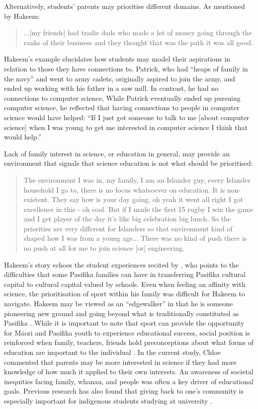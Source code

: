 Alternatively, students' parents may prioritise different domains. As mentioned by Hakeem: \blockquote{...[my friends] had tradie dads who made a lot of money going through the ranks of their business and they thought that was the path it was all good.} Hakeem's example elucidates how students may model their aspirations in relation to those they have connections to. Patrick, who had ``heaps of family in the navy'' and went to army cadets, originally aspired to join the army, and ended up working with his father in a saw mill. In contrast, he had no connections to computer science, While Patrick eventually ended up pursuing computer science, he reflected that having connections to people in computer science would have helped:  ``If I just got someone to talk to me [about computer science] when I was young to get me interested in computer science I think that would help.'' 

Lack of family interest in science, or education in general, may provide an environment that signals that science education is not what should be prioritised: \blockquote{The environment I was in, my family, I am an Islander guy, every Islander household I go to, there is no focus whatsoever on education. It is non-existent. They say how is your day going, oh yeah it went all right I got excellence in this - oh cool. But if I made the first 15 rugby I win the game and I get player of the day it's like big celebration big lunch. So the priorities are very different for Islanders so that environment kind of shaped how I was from a young age... There was no kind of push there is no push at all for me to join science [or] engineering.}. Hakeem's story echoes the student experiences recited by \cite{mila2011polycultural}, who points to the difficulties that some Pasifika families can have in transferring Pasifika cultural capital to cultural capital valued by schools. Even when feeling an affinity with science, the prioritisation of sport within his family was difficult for Hakeem to navigate. Hakeem may be viewed as an ``edgewalker'' \citep{krebs1999edgewalkers,tupuola2004pasifika} in that he is someone pioneering new ground and going beyond what is traditionally constituted as Pasifika \cite[p.8]{mila2011polycultural}.  While it is important to note that sport can provide the opportunity for M\={a}ori and Pasifika youth to experience educational success, social position is reinforced when family, teachers, friends hold preconceptions about what forms of education are important to the individual \citep{fitzpatrick2013brown}. In the current study, Chloe commented that parents may be more interested in science if they had more knowledge of how much it applied to their own interests. An awareness of societal inequities facing family, whanau, and people was often a key driver of educational goals. Previous research has also found that giving back to one's community is especially important for indigenous students studying at university \citep{mayeda2014you}.


